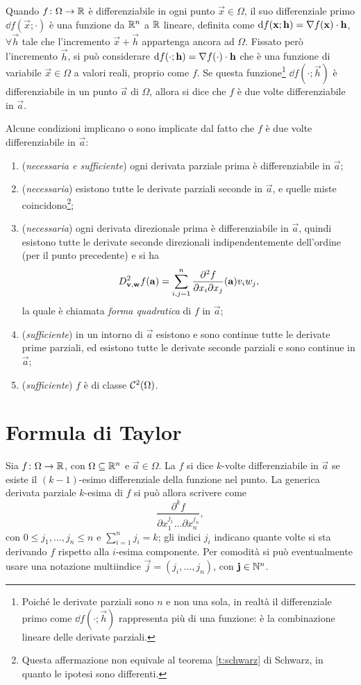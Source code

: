 Quando $f\colon\Omega\to\mathbb{R}$ è differenziabile in ogni punto $\vec x\in\Omega$, il suo differenziale primo $\dd f(\vec x;\cdot)$ è una funzione da $\mathbb{R}^n$ a $\mathbb{R}$ lineare, definita come $\textup{d} f(\mathbf{x};\mathbf{h})={\nabla f(\mathbf{x})}\cdot{\mathbf{h}}$, $\forall\vec h$ tale che l'incremento $\vec x+\vec h$ appartenga ancora ad $\Omega$. Fissato però l'incremento $\vec h$, si può considerare $\textup{d} f(\cdot;\mathbf{h})={\nabla f(\cdot)}\cdot{\mathbf{h}}$ che è una funzione di variabile $\vec x\in\Omega$ a valori reali, proprio come $f$. Se questa funzione\footnote{Poiché le derivate parziali sono $n$ e non una sola, in realtà il differenziale primo come $\dd f(\cdot;\vec h)$ rappresenta più di una funzione: è la combinazione lineare delle derivate parziali.} $\dd f(\cdot;\vec h)$ è differenziabile in un punto $\vec a$ di $\Omega$, allora si dice che $f$ è due volte differenziabile in $\vec a$.

Alcune condizioni implicano o sono implicate dal fatto che $f$ è due volte differenziabile in $\vec a$:
\begin{enumerate}
\item (\textit{necessaria e sufficiente}) ogni derivata parziale prima è differenziabile in $\vec a$;
\item (\textit{necessaria}) esistono tutte le derivate parziali seconde in $\vec a$, e quelle miste coincidono\footnote{Questa affermazione non equivale al teorema \ref{t:schwarz} di Schwarz, in quanto le ipotesi sono differenti.};
\item (\textit{necessaria}) ogni derivata direzionale prima è differenziabile in $\vec a$, quindi esistono tutte le derivate seconde direzionali indipendentemente dell'ordine (per il punto precedente) e si ha
\[
D^2_{\mathbf{v},\mathbf{w}}f(\mathbf{a})=\sum_{i,j=1}^n\frac{\partial^2f}{\partial x_i\partial x_j}(\mathbf{a})v_iw_j,
\]
la quale è chiamata \emph{forma quadratica} di $f$ in $\vec a$;
\item (\textit{sufficiente}) in un intorno di $\vec a$ esistono e sono continue tutte le derivate prime parziali, ed esistono tutte le derivate seconde parziali e sono continue in $\vec a$;
\item (\textit{sufficiente}) $f$ è di classe $\mathcal{C}^{{2}}(\Omega)$.
\end{enumerate}

\section{Formula di Taylor}
Sia $f\colon\Omega\to\mathbb{R}$, con $\Omega\subseteq\mathbb{R}^n$ e $\vec a\in\Omega$. La $f$ si dice $k$-volte differenziabile in $\vec a$ se esiste il $(k-1)$-esimo differenziale della funzione nel punto.
La generica derivata parziale $k$-esima di $f$ si può allora scrivere come
\[
\frac{\partial^kf}{\partial x_1^{j_1}\dots\partial x_n^{j_n}},
\]
con $0\leq j_1,\dots,j_n\leq n$ e $\sum_{i=1}^nj_i=k$; gli indici $j_i$ indicano quante volte si sta derivando $f$ rispetto alla $i$-esima componente.
Per comodità si può eventualmente usare una notazione multiindice $\vec j=(j_i,\dots,j_n)$, con $\mathbf{j}\in\mathbb{N}^n$.

